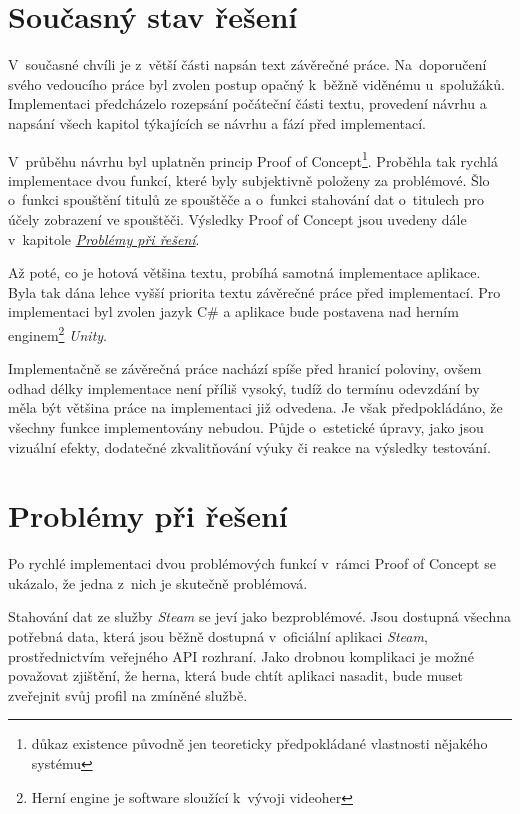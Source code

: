 \documentclass[12pt, a4paper]{article}
\begin{document}
\section{Současný stav řešení}

V~současné chvíli je z~větší části napsán text závěrečné práce. Na~doporučení svého vedoucího práce byl zvolen postup opačný k~běžně viděnému u~spolužáků. Implementaci předcházelo rozepsání počáteční části textu, provedení návrhu a napsání všech kapitol týkajících se návrhu a fází před implementací.

V~průběhu návrhu byl uplatněn princip Proof of Concept\footnote{důkaz existence původně jen teoreticky předpokládané vlastnosti nějakého systému\cite{slov}}. Proběhla tak rychlá implementace dvou funkcí, které byly subjektivně položeny za problémové. Šlo o~funkci spouštění titulů ze spouštěče a o~funkci stahování dat o~titulech pro účely zobrazení ve spouštěči. Výsledky Proof of Concept jsou uvedeny dále v~kapitole \hyperref[problemy]{\textit{Problémy při řešení}}.

Až poté, co je hotová většina textu, probíhá samotná implementace aplikace. Byla tak dána lehce vyšší priorita textu závěrečné práce před implementací. Pro implementaci byl zvolen jazyk C\# a aplikace bude postavena nad herním enginem\footnote{Herní engine je software sloužící k~vývoji videoher\cite{hernieng}} \textit{Unity}.

Implementačně se závěrečná práce nachází spíše před hranicí poloviny, ovšem odhad délky implementace není příliš vysoký, tudíž do termínu odevzdání by měla být většina práce na implementaci již odvedena. Je však předpokládáno, že všechny funkce implementovány nebudou. Půjde o~estetické úpravy, jako jsou vizuální efekty, dodatečné zkvalitňování výuky či reakce na výsledky testování.

\section{Problémy při řešení}
\label{problemy}

Po rychlé implementaci dvou problémových funkcí v~rámci Proof of Concept se ukázalo, že jedna z~nich je skutečně problémová.

Stahování dat ze služby \textit{Steam} se jeví jako bezproblémové. Jsou dostupná všechna potřebná data, která jsou běžně dostupná v~oficiální aplikaci \textit{Steam}, prostřednictvím veřejného API rozhraní. Jako drobnou komplikaci je možné považovat zjištění, že herna, která bude chtít aplikaci nasadit, bude muset zveřejnit svůj profil na zmíněné službě.
\end{document}
